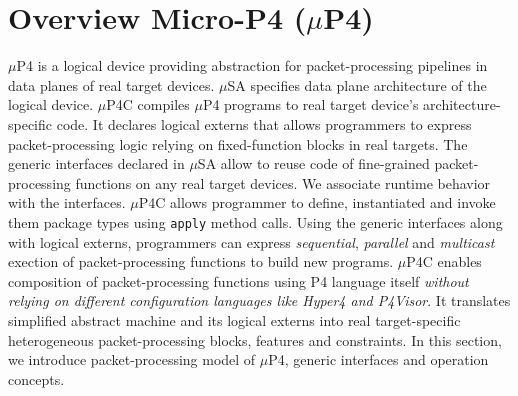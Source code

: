 \documentclass{hotnets19}
\newcommand{\hs}[1]{{\color{blue}{HS:#1}}}
\begin{document}




\section{Overview Micro-P4 \;($\mu$P4)}
\label{section:overview-micro-p4}

$\mu$P4 is a logical device providing abstraction for packet-processing pipelines in data planes of real target devices.
$\mu$SA specifies data plane architecture of the logical device.
$\mu$P4C compiles $\mu$P4 programs to real target device's architecture-specific code.
It declares logical externs that allows programmers to express packet-processing logic relying on fixed-function blocks in real targets.
The generic interfaces declared in $\mu$SA allow to reuse code of fine-grained packet-processing functions on any real target devices.
We associate runtime behavior with the interfaces.
$\mu$P4C allows programmer to define, instantiated and invoke them package types using \texttt{apply} method calls.
Using the generic interfaces along with logical externs, programmers can express \emph{sequential}, \emph{parallel} and \emph{multicast} exection of packet-processing functions to build new programs.
$\mu$P4C enables composition of packet-processing functions using P4 language itself \hs{in related work}\emph{without relying on different configuration languages like Hyper4 and P4Visor}.
It translates simplified abstract machine and its logical externs into real target-specific heterogeneous packet-processing blocks, features and constraints.
In this section, we introduce packet-processing model of $\mu$P4, generic interfaces and operation concepts.
\end{document}
